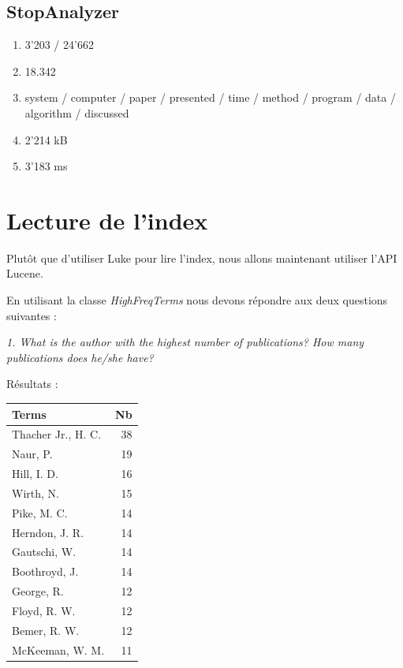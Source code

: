 \subsection{StopAnalyzer}
\begin{enumerate}
    \item 3'203 / 24'662
    \item 18.342
    \item system / computer / paper / presented / time / method / program / data / algorithm / discussed
    \item 2'214 kB
    \item 3'183 ms
\end{enumerate}

\section{Lecture de l'index}

Plutôt que d'utiliser Luke pour lire l'index, nous allons maintenant utiliser l'API Lucene.

En utilisant la classe \textit{HighFreqTerms} nous devons répondre aux deux questions suivantes :

\textit{1. What is the author with the highest number of publications? How many publications does he/she have?}

Résultats :

\begin{center}
    \begin{tabular}{|l|r|}
      \hline
      Terms & Nb \\
      \hline
      Thacher Jr., H. C. & 38 \\
      Naur, P. & 19 \\
      Hill, I. D. & 16 \\
      Wirth, N. & 15 \\
      Pike, M. C. & 14 \\
      Herndon, J. R. & 14 \\
      Gautschi, W. & 14 \\
      Boothroyd, J. & 14 \\
      George, R. & 12 \\
      Floyd, R. W. & 12 \\
      Bemer, R. W. & 12 \\
      McKeeman, W. M. & 11 \\
      \hline
    \end{tabular}
\end{center}

